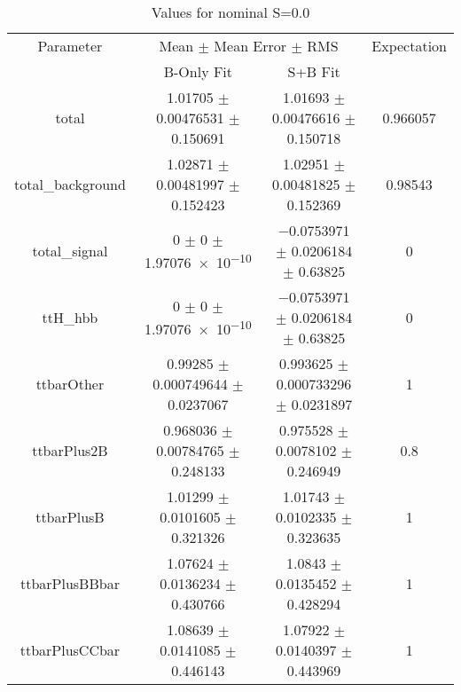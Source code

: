 \begin{table}
\centering
\caption{Values for nominal S=0.0}
\begin{tabular}{cccc}
\toprule
Parameter & \multicolumn{2}{c}{Mean $\pm$ Mean Error $\pm$ RMS} & Expectation\\
 & B-Only Fit & S+B Fit & \\
\midrule
total & \num{1.01705} $\pm$ \num{0.00476531} $\pm$ \num{0.150691} & \num{1.01693} $\pm$ \num{0.00476616} $\pm$ \num{0.150718} & \num{0.966057}\\
total\_background & \num{1.02871} $\pm$ \num{0.00481997} $\pm$ \num{0.152423} & \num{1.02951} $\pm$ \num{0.00481825} $\pm$ \num{0.152369} & \num{0.98543}\\
total\_signal & \num{0} $\pm$ \num{0} $\pm$ \num{1.97076e-10} & \num{-0.0753971} $\pm$ \num{0.0206184} $\pm$ \num{0.63825} & \num{0}\\
ttH\_hbb & \num{0} $\pm$ \num{0} $\pm$ \num{1.97076e-10} & \num{-0.0753971} $\pm$ \num{0.0206184} $\pm$ \num{0.63825} & \num{0}\\
ttbarOther & \num{0.99285} $\pm$ \num{0.000749644} $\pm$ \num{0.0237067} & \num{0.993625} $\pm$ \num{0.000733296} $\pm$ \num{0.0231897} & \num{1}\\
ttbarPlus2B & \num{0.968036} $\pm$ \num{0.00784765} $\pm$ \num{0.248133} & \num{0.975528} $\pm$ \num{0.0078102} $\pm$ \num{0.246949} & \num{0.8}\\
ttbarPlusB & \num{1.01299} $\pm$ \num{0.0101605} $\pm$ \num{0.321326} & \num{1.01743} $\pm$ \num{0.0102335} $\pm$ \num{0.323635} & \num{1}\\
ttbarPlusBBbar & \num{1.07624} $\pm$ \num{0.0136234} $\pm$ \num{0.430766} & \num{1.0843} $\pm$ \num{0.0135452} $\pm$ \num{0.428294} & \num{1}\\
ttbarPlusCCbar & \num{1.08639} $\pm$ \num{0.0141085} $\pm$ \num{0.446143} & \num{1.07922} $\pm$ \num{0.0140397} $\pm$ \num{0.443969} & \num{1}\\
\bottomrule
\end{tabular}
\end{table}